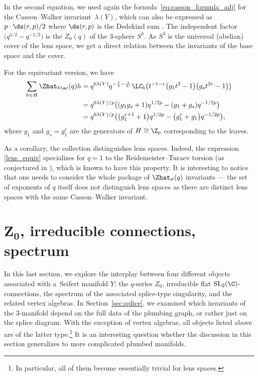 \documentclass[10pt,a4paper]{amsart}
\begin{document}
In the second equation, we used again the formula~\eqref{eq:casson_formula_adj} for the Casson--Walker invariant~$\lambda(Y)$, which can also be expressed as $p \cdot \ds(r,p)/2$ where $\ds(r,p)$ is the Dedekind sum \cite[Example~9.3.6]{Nem22}. The independent factor $\bigl(q^{1/2}-q^{-1/2}\bigr)$ is the $Z_0(q)$ of the 3-sphere $S^3$. As $S^3$ is the universal (abelian) cover of the lens space, we get a direct relation between the invariants of the base space and the cover.

For the equivariant version, we have
\begin{align}
	\sum_{h \in H} \Zhat_{h \ac}(q)h & = q^{6\lambda(Y)}q^{-\frac{r}{4}-\frac{1}{4r}} \LC_b \bigl(t^{-1-r}\bigl(g_1 t^2-1\bigr)\bigl(g_s t^{2r}-1\bigr)\bigr)\nonumber\\
	 & = q^{6\lambda(Y)/p} \bigl((g_1g_s+1) q^{1/2p} - (g_1+g_s) q^{-1/2p}\bigr)\nonumber\\
				& = q^{6\lambda(Y)/p} \bigl(\bigl(g_1^{r+1}+1\bigr) q^{1/2p} - \bigl(g_1^{r}+g_1\bigr) q^{-1/2p}\bigr),\label{lens_equiv}
\end{align}
where $g_1$ and $g_s=g_1^r$ are the generators of $H \cong \Z_p$ corresponding to the leaves.

As a corollary, the collection  distinguishes lens spaces. Indeed, the expression \ref{lens_equiv} specializes for $q=1$ to the Reidemeister--Turaev torsion (as conjectured in \cite{CGPS20}), which is known to have this property. It is interesting to notice that one needs to consider the whole package of $\Zhat_\sigma(q)$ invariants --- the set of exponents of $q$ itself does not distinguish lens spaces as there are distinct lens spaces with the same Casson--Walker invariant.

\section[Z\_0, irreducible connections, spectrum]{$\boldsymbol{Z_0}$, irreducible connections, spectrum}\label{sec:spectrum}

In this last section, we explore the interplay between four different objects associated with a~Seifert manifold $Y$: the $q$-series $Z_0$, irreducible flat $\operatorname{SL}_2(\C)$-connections, the spectrum of the associated splice-type singularity, and the related vertex algebras. In Section~\ref{sec:splice}, we examined which invariants of the 3-manifold depend on the full data of the plumbing graph, or rather just on the splice diagram. With the exception of vertex algebras, all objects listed above are of the latter type.\footnote{In particular, all of them become essentially trivial for lens spaces.} It is an interesting question whether the discussion in this section generalizes to more complicated plumbed manifolds.
\end{document}

